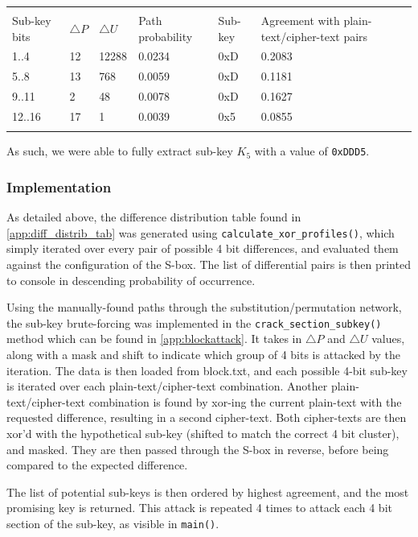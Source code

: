 \documentclass[british,10pt,a4paper]{article}
\begin{document}
\begin{center}
	\begin{tabular}{llllll}\label{tab:pathprobabilities} \\
		\toprule \\
		Sub-key bits & $\triangle P$ & $\triangle U$ & Path probability &  Sub-key & Agreement with plain-text/cipher-text pairs\\
		1..4 & 12 & 12288 & 0.0234 & 0xD & 0.2083\\ 
		5..8 & 13 & 768 & 0.0059 & 0xD & 0.1181\\ 
		9..11 & 2 & 48 & 0.0078 & 0xD & 0.1627\\
		12..16 & 17 & 1 & 0.0039 & 0x5 & 0.0855\\ 
		\bottomrule \\
	\end{tabular}
\end{center}
As such, we were able to fully extract sub-key \(K_5\) with a value of \lstinline{0xDDD5}.
\subsubsection{Implementation}
As detailed above, the difference distribution table found in \autoref{app:diff_distrib_tab} was generated using \lstinline{calculate_xor_profiles()}, which simply iterated over every pair of possible 4 bit differences, and evaluated them against the configuration of the S-box. The list of differential pairs is then printed to console in descending probability of occurrence.

Using the manually-found paths through the substitution/permutation network, the sub-key brute-forcing was implemented in the \lstinline{crack_section_subkey()} method which can be found in \autoref{app:blockattack}. It takes in $\triangle P$ and $\triangle U$ values, along with a mask and shift to indicate which group of 4 bits is attacked by the iteration. The data is then loaded from block.txt, and each possible 4-bit sub-key is iterated over each plain-text/cipher-text combination. Another plain-text/cipher-text combination is found by xor-ing the current plain-text with the requested difference, resulting in a second cipher-text. Both cipher-texts are then xor'd with the hypothetical sub-key (shifted to match the correct 4 bit cluster), and masked. They are then passed through the S-box in reverse, before being compared to the expected difference. 

The list of potential sub-keys is then ordered by highest agreement, and the most promising key is returned. This attack is repeated 4 times to attack each 4 bit section of the sub-key, as visible in \lstinline{main()}.
\end{document}
